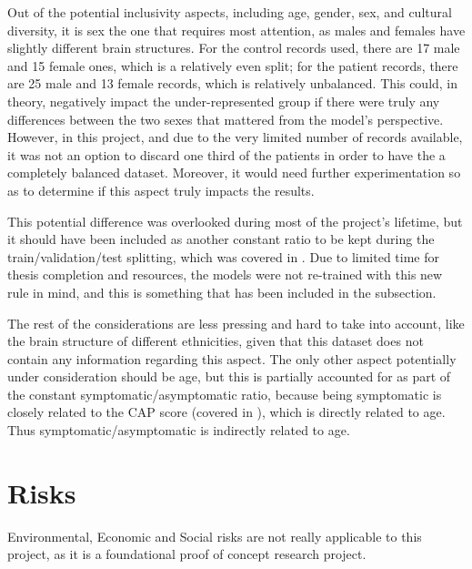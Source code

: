 Out of the potential inclusivity aspects, including age, gender, sex, and cultural diversity, it is sex the one that requires most attention, as males and females have slightly different brain structures. \cite{sexbrain} For the control records used, there are 17 male and 15 female ones, which is a relatively even split; for the patient records, there are 25 male and 13 female records, which is relatively unbalanced. This could, in theory, negatively impact the under-represented group if there were truly any differences between the two sexes that mattered from the model’s perspective. However, in this project, and due to the very limited number of records available, it was not an option to discard one third of the patients in order to have the a completely balanced dataset. Moreover, it would need further experimentation so as to determine if this aspect truly impacts the results.\par
This potential difference was overlooked during most of the project’s lifetime, but it should have been included as another constant ratio to be kept during the train/validation/test splitting, which was covered in . Due to limited time for thesis completion and resources, the models were not re-trained with this new rule in mind, and this is something that has been included in the  subsection.\par
The rest of the considerations are less pressing and hard to take into account, like the brain structure of different ethnicities, given that this dataset does not contain any information regarding this aspect. The only other aspect potentially under consideration should be age, but this is partially accounted for as part of the constant symptomatic/asymptomatic ratio, because being symptomatic is closely related to the \ac{CAP} score (covered in ), which is directly related to age. Thus symptomatic/asymptomatic is indirectly related to age.

\section{Risks}

Environmental, Economic and Social risks are not really applicable to this project, as it is a foundational proof of concept research project.








